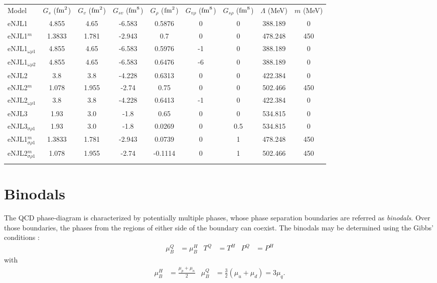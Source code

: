 \documentclass{ws-ijmpcs}
\begin{document}
\begin{table}[hb]
{\begin{tabular}{@{}lcccccccc@{}}\toprule
Model & $G_s$ ($\rm{fm}^2$) & $G_v$ ($\rm{fm}^2$) & $G_{sv}$ ($\rm{fm}^8$) & $G_\rho$ ($\rm{fm}^2$) & $G_{v\rho}$ ($\rm{fm}^8$) & $G_{s\rho}$ ($\rm{fm}^8$) & $\Lambda$ (MeV) & $m$ (MeV) \\ \colrule
eNJL1 & 4.855 & 4.65 & -6.583 & 0.5876 & 0 & 0 & 388.189 & 0 \\
eNJL1$^m$ & 1.3833 & 1.781 & -2.943 & 0.7 & 0 & 0 & 478.248 & 450 \\
eNJL1$_{\omega\rho 1}$ & 4.855 & 4.65 & -6.583 & 0.5976 & -1 & 0 & 388.189 & 0 \\
eNJL1$_{\omega\rho 2}$ & 4.855 & 4.65 & -6.583 & 0.6476 & -6 & 0 & 388.189 & 0 \\
eNJL2 & 3.8 & 3.8 & -4.228 & 0.6313 & 0 & 0 & 422.384 & 0 \\
eNJL2$^m$ & 1.078 & 1.955 & -2.74 & 0.75 & 0 & 0 & 502.466 & 450 \\
eNJL2$_{\omega\rho 1}$ & 3.8 & 3.8 & -4.228 & 0.6413 & -1 & 0 & 422.384 & 0 \\
eNJL3 & 1.93 & 3.0 & -1.8 & 0.65 & 0 & 0 & 534.815 & 0 \\
eNJL3$_{\sigma\rho 1}$ & 1.93 & 3.0 & -1.8 & 0.0269 & 0 & 0.5 & 534.815 & 0 \\
eNJL1$^m_{\sigma\rho 1}$ & 1.3833 & 1.781 & -2.943 & 0.0739 & 0 & 1 & 478.248 & 450 \\
eNJL2$^m_{\sigma\rho 1}$ & 1.078 & 1.955 & -2.74 & -0.1114 & 0 & 1 & 502.466 & 450 \\
\botrule
\end{tabular}\label{Tab:Parametros_eNJL}}
\end{table}


\section{Binodals}

The QCD phase-diagram is characterized by potentially multiple phases, whose phase separation boundaries are referred as \emph{binodals}. Over those boundaries, the phases from the regions of either side of the boundary can coexist. The binodals may be determined using the Gibbs' conditions \cite{Cavagnoli2011}:
\begin{align}
\mu_B^Q &= \mu_B^H & T^Q &= T^H & P^Q &= P^H
\end{align}
%
with
\begin{align*}
\mu_B^H &= \frac{\mu_p + \mu_n}{2} & 	\mu_B^Q &= \frac{3}{2} (\mu_u + \mu_d) = 3 \mu_q.
\end{align*}
\end{document}
